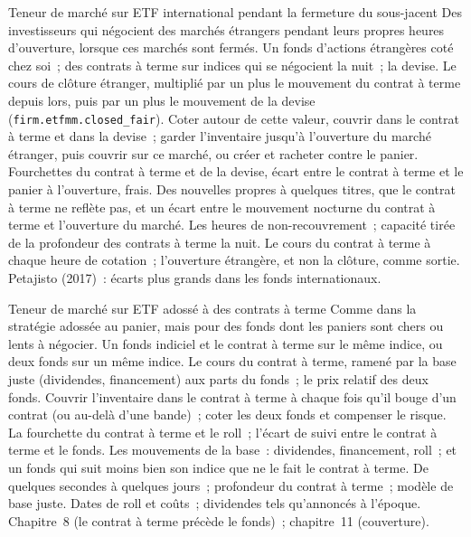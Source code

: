 \begin{strategyfile}{Teneur de marché sur ETF international pendant la fermeture du sous-jacent}\label{strat:hf:etf-market-making:international}
 Des investisseurs qui négocient des marchés étrangers pendant leurs propres heures d'ouverture, lorsque ces marchés sont fermés.
 Un fonds d'actions étrangères coté chez soi~; des contrats à terme sur indices qui se négocient la nuit~; la devise.
 Le cours de clôture étranger, multiplié par un plus le mouvement du contrat à terme depuis lors, puis par un plus le mouvement de la devise (\texttt{firm.etfmm.closed\_fair}).
 Coter autour de cette valeur, couvrir dans le contrat à terme et dans la devise~; garder l'inventaire jusqu'à l'ouverture du marché étranger, puis
couvrir sur ce marché, ou créer et racheter contre le panier.
 Fourchettes du contrat à terme et de la devise, écart entre le contrat à terme et le panier à l'ouverture, frais.
 Des nouvelles propres à quelques titres, que le contrat à terme ne reflète pas, et un écart entre le mouvement nocturne du contrat à terme et
l'ouverture du marché.
 Les heures de non-recouvrement~; capacité tirée de la profondeur des contrats à terme la nuit.
 Le cours du contrat à terme à chaque heure de cotation~; l'ouverture étrangère, et non la clôture, comme sortie.
 Petajisto (2017)~: écarts plus grands dans les fonds internationaux.
\end{strategyfile}

\begin{strategyfile}{Teneur de marché sur ETF adossé à des contrats à terme}\label{strat:hf:etf-market-making:futures}
 Comme dans la stratégie adossée au panier, mais pour des fonds dont les paniers sont chers ou lents à négocier.
 Un fonds indiciel et le contrat à terme sur le même indice, ou deux fonds sur un même indice.
 Le cours du contrat à terme, ramené par la base juste (dividendes, financement) aux parts du fonds~; le prix relatif des deux fonds.
 Couvrir l'inventaire dans le contrat à terme à chaque fois qu'il bouge d'un contrat (ou au-delà d'une bande)~; coter les deux fonds et compenser le risque.
 La fourchette du contrat à terme et le roll~; l'écart de suivi entre le contrat à terme et le fonds.
 Les mouvements de la base~: dividendes, financement, roll~; et un fonds qui suit moins bien son indice que ne le fait le contrat à terme.
 De quelques secondes à quelques jours~; profondeur du contrat à terme~; modèle de base juste.
 Dates de roll et coûts~; dividendes tels qu'annoncés à l'époque.
 Chapitre~8 (le contrat à terme précède le fonds)~; chapitre~11 (couverture).
\end{strategyfile}

